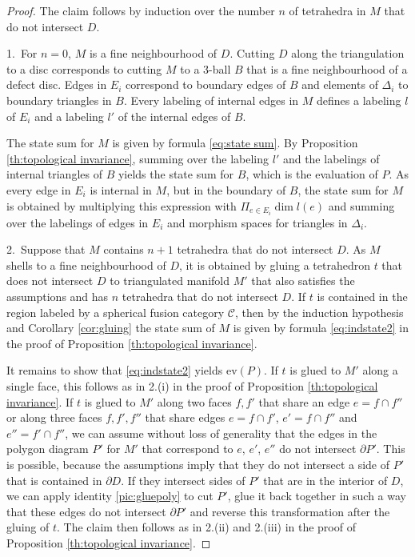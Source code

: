 \documentclass[1.5pt, a4paper]{article}
\newcommand{\mac}{\mathcal C}
\newcommand{\ev}{\mathrm{ev}}
\begin{document}
\begin{proof} 
The claim  follows by induction over the number $n$  of tetrahedra in $M$ that do not intersect $D$. 

1.~For $n=0$,  $M$ is a fine neighbourhood of $D$. Cutting $D$ along the triangulation to a disc corresponds to cutting $M$ to a 3-ball $B$ that is a fine neighbourhood of a defect disc. 
Edges in $E_i$ correspond to  boundary edges of $B$  and elements of $\Delta_i$ to boundary triangles in $B$.   Every labeling of internal edges in $M$  defines a labeling $l$ of  $E_i$ and a labeling $l'$ of the internal edges of $B$. 

The state sum for $M$ is given by formula \eqref{eq:state sum}. 
By Proposition \ref{th:topological invariance}, summing over the labeling $l'$ and the labelings of internal triangles of $B$  yields the state sum for $B$, which is the evaluation of $P$. 
As every edge in $E_i$ is internal in $M$, but  in the boundary of $B$, the state sum for $M$ is obtained by multiplying this expression with $\Pi_{e\in E_{i}} \dim l(e)$
and summing over the labelings of edges in $E_i$ and morphism spaces for triangles in $\Delta_i$.

2.~Suppose that  $M$ contains $n+1$ tetrahedra that do not intersect $D$. 
As $M$ shells to a fine neighbourhood of $D$, it is obtained by gluing a tetrahedron $t$  that does not intersect $D$ to triangulated manifold  $M'$ that also satisfies the assumptions and has $n$ tetrahedra that do not intersect $D$.  
If $t$ is contained in the region labeled by a spherical fusion category $\mac$, then by the induction hypothesis and 
Corollary \ref{cor:gluing} the state sum of $M$ is given by formula  \eqref{eq:indstate2} in the proof of Proposition \ref{th:topological invariance}. 

It remains to show that  \eqref{eq:indstate2} yields  $\ev(P)$. 
If $t$ is glued to $M'$ along a single face, this follows as in 2.(i) in the proof of Proposition \ref{th:topological invariance}. 
 If $t$ is glued to $M'$ along two faces $f,f'$ that share an edge $e=f\cap f''$ or along three faces $f,f', f''$ that share edges $e=f\cap f'$, $e'=f\cap f''$ and $e''=f'\cap f''$, 
  we can assume without loss of generality that the edges in the polygon diagram  $P'$ for $M'$  that correspond to $e$, $e'$, $e''$ do not intersect  $\partial P'$. This is possible, because the assumptions imply that they do not intersect a side of $P'$ that is contained in $\partial D$. If they intersect  sides of $P'$ that are in the interior of  $D$, we 
can apply identity \eqref{pic:gluepoly} to cut   $P'$, glue it back together in such a way that these edges do not intersect $\partial P'$ and reverse this transformation after the gluing of $t$.
The claim then  follows as in 2.(ii) and 2.(iii) in the proof of Proposition \ref{th:topological invariance}. \end{proof}
\end{document}
